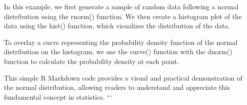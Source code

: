 \documentclass[]{tufte-handout}
\begin{document}
In this example, we first generate a sample of random data following a
normal distribution using the rnorm() function. We then create a
histogram plot of the data using the hist() function, which visualizes
the distribution of the data.

To overlay a curve representing the probability density function of the
normal distribution on the histogram, we use the curve() function with
the dnorm() function to calculate the probability density at each point.

This simple R Markdown code provides a visual and practical
demonstration of the normal distribution, allowing readers to understand
and appreciate this fundamental concept in statistics. ```


\end{document}
